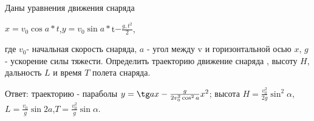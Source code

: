 Даны уравнения движения снаряда

$x=v_{0}\cos a\ast t$,$y=v_{0}\sin a\ast$t$-\frac{g,t^2}{2}$,

где $v_{0}$- начальная скорость снаряда, $a$ - угол между v и горизонтальной осью $x$, $g$ - ускорение силы тяжести.
Определить траекторию движение снаряда , высоту $H$, дальность $L$ и время $T$ полета снаряда.

Ответ: траекторию - параболы $y=\tg a x - \frac{g}{2v^2_{0}\cos^2 a}x^2$; высота
$H=\frac{v^2_{0}}{2g}\sin^2 \alpha$,$L=\frac{v_{0}}{g}\sin 2a$,$T=\frac{v^2_{0}}{g}\sin\alpha$.
